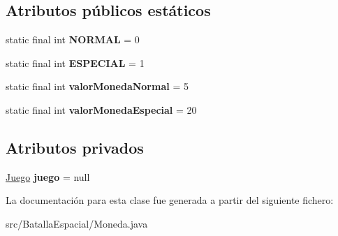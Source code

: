 \subsection*{Atributos públicos estáticos}
\begin{DoxyCompactItemize}
\item 
\hypertarget{classBatallaEspacial_1_1Moneda_a654208ec5d3777dce09f0ea94d754abf}{
static final int {\bfseries NORMAL} = 0}
\label{classBatallaEspacial_1_1Moneda_a654208ec5d3777dce09f0ea94d754abf}

\item 
\hypertarget{classBatallaEspacial_1_1Moneda_a5bfdbf4353f4232066f2784b2836aff8}{
static final int {\bfseries ESPECIAL} = 1}
\label{classBatallaEspacial_1_1Moneda_a5bfdbf4353f4232066f2784b2836aff8}

\item 
\hypertarget{classBatallaEspacial_1_1Moneda_aafc076cdffc6b1f670b68999f2da457a}{
static final int {\bfseries valorMonedaNormal} = 5}
\label{classBatallaEspacial_1_1Moneda_aafc076cdffc6b1f670b68999f2da457a}

\item 
\hypertarget{classBatallaEspacial_1_1Moneda_aed21f0c283b5dca8fe76e1a62d9883b2}{
static final int {\bfseries valorMonedaEspecial} = 20}
\label{classBatallaEspacial_1_1Moneda_aed21f0c283b5dca8fe76e1a62d9883b2}

\end{DoxyCompactItemize}
\subsection*{Atributos privados}
\begin{DoxyCompactItemize}
\item 
\hypertarget{classBatallaEspacial_1_1Moneda_ac6efe7b8d5bc79b472de1a920e27c414}{
\hyperlink{classBatallaEspacial_1_1Juego}{Juego} {\bfseries juego} = null}
\label{classBatallaEspacial_1_1Moneda_ac6efe7b8d5bc79b472de1a920e27c414}

\end{DoxyCompactItemize}


La documentación para esta clase fue generada a partir del siguiente fichero:\begin{DoxyCompactItemize}
\item 
src/BatallaEspacial/Moneda.java\end{DoxyCompactItemize}
